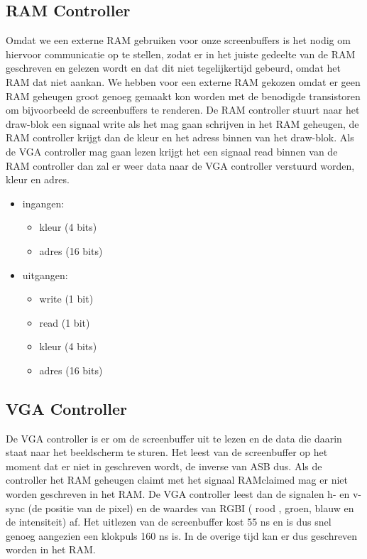 \subsection{RAM Controller}
Omdat we een externe RAM gebruiken voor onze screenbuffers is het nodig om hiervoor communicatie op te stellen, zodat er in het juiste gedeelte van de RAM geschreven en gelezen wordt en dat dit niet tegelijkertijd gebeurd, omdat het RAM dat niet aankan. We hebben voor een externe RAM gekozen omdat er geen RAM geheugen groot genoeg gemaakt kon worden met de benodigde transistoren om bijvoorbeeld de screenbuffers te renderen. De RAM controller stuurt naar het draw-blok een signaal write als het mag gaan schrijven in het RAM geheugen, de RAM controller krijgt dan de kleur en het adress binnen van het draw-blok. Als de VGA controller mag gaan lezen krijgt het een signaal read binnen van de RAM controller dan zal er weer data naar de VGA controller verstuurd worden, kleur en adres.

\begin {itemize}
\item ingangen:
\begin {itemize}
\item kleur (4 bits)
\item adres (16 bits)
\end {itemize}
\item uitgangen:
\begin {itemize}
\item write (1 bit)
\item read (1 bit)
\item kleur (4 bits)
\item adres (16 bits)
\end {itemize}
\end {itemize}

\subsection{VGA Controller}
De VGA controller is er om de screenbuffer uit te lezen en de data die daarin staat naar het beeldscherm te sturen. Het leest van de screenbuffer op het moment dat er niet in geschreven wordt, de inverse van ASB dus. Als de controller het RAM geheugen claimt met het signaal RAMclaimed mag er niet worden geschreven in het RAM. De VGA controller leest dan de signalen h- en v-sync (de positie van de pixel) en de waardes van RGBI ( rood , groen, blauw en de intensiteit) af. Het uitlezen van de screenbuffer kost 55 ns en is dus snel genoeg aangezien een klokpuls 160 ns is. In de overige tijd kan er dus geschreven worden in het RAM.

